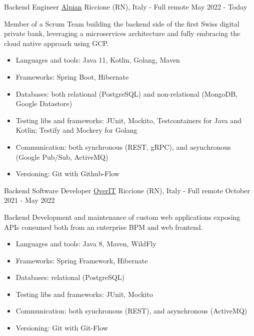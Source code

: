 

\begin{cventries}
	
\cventry
{Backend Engineer} %
{\href{https://alpian.com/}{Alpian}} %
{Riccione (RN), Italy - Full remote} %
{May 2022 - Today} %
{
	Member of a Scrum Team building the backend side of the first Swiss digital private bank, leveraging a microservices architecture and fully embracing the cloud native approach using GCP.
	\begin{itemize}
		\item {Languages and tools: Java 11, Kotlin, Golang, Maven}
		\item {Frameworks: Spring Boot, Hibernate}
		\item {Databases: both relational (PostgreSQL) and non-relational (MongoDB, Google Datastore)}
		\item {Testing libs and frameworks: JUnit, Mockito, Testcontainers for Java and Kotlin; Testify and Mockery for Golang}
		\item {Communication: both synchronous (REST, gRPC), and asynchronous (Google Pub/Sub, ActiveMQ)}
		\item {Versioning: Git with Github-Flow}
	\end{itemize}
}


\cventry
	{Backend Software Developer} %
	{\href{https://overit.it/en}{OverIT}} %
	{Riccione (RN), Italy - Full remote} %
	{October 2021 - May 2022} %
	{
		Backend Development and maintenance of custom web applications exposing APIs consumed both from an enterprise BPM and web frontend.
		\begin{itemize}
			\item {Languages and tools: Java 8, Maven, WildFly}
			\item {Frameworks: Spring Framework, Hibernate}
			\item {Databases: relational (PostgreSQL)}
			\item {Testing libs and frameworks: JUnit, Mockito}
			\item {Communication: both synchronous (REST), and asynchronous (ActiveMQ)}
			\item {Versioning: Git with Git-Flow}
		\end{itemize}
	}


\end{cventries}
